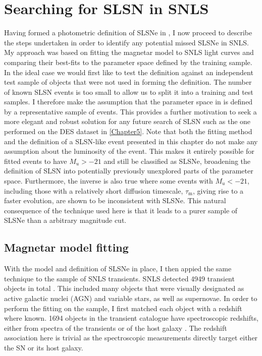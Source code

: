 \section{Searching for SLSN in SNLS}
Having formed a photometric definition of SLSNe in , I now proceed to describe the steps undertaken in order to identify any potential missed SLSNe in SNLS. My approach was based on fitting the magnetar model to SNLS light curves and comparing their best-fits to the parameter space defined by the training sample. In the ideal case we would first like to test the definition against an independent test sample of objects that were not used in forming the definition. The number of known SLSN events is too small to allow us to split it into a training and test samples. I therefore make the assumption that the parameter space in  is defined by a representative sample of events. This provides a further motivation to seek a more elegant and robust solution for any future search of SLSN such as the one performed on the DES dataset in \cref{Chapter5}. Note that both the fitting method and the definition of a SLSN-like event presented in this chapter do not make any assumption about the luminosity of the event. This makes it entirely possible for fitted events to have $M_u>-21$ and still be classified as SLSNe, broadening the definition of SLSN into potentially previously unexplored parts of the parameter space. Furthermore, the inverse is also true where some events with $M_u<-21$, including those with a relatively short diffusion timescale, $\tau_\mathrm{m}$, giving rise to a faster evolution, are shown to be inconsistent with SLSNe. This natural consequence of the technique used here is that it leads to a purer sample of SLSNe than a arbitrary magnitude cut.

\subsection{Magnetar model fitting}
With the model and definition of SLSNe in place, I then appied the same technique to the sample of SNLS transients. SNLS detected 4949 transient objects in total \citep{Perrett2010}. This included many objects that were visually designated as active galactic nuclei (AGN) and variable stars, as well as supernovae. In order to perform the fitting on the sample, I first matched each object with a redshift where known. 1694 objects in the transient catalogue have spectroscopic redshifts, either from spectra of the transients or of the host galaxy \citep{Perrett2012}. The redshift association here is trivial as the spectroscopic measurements directly target either the SN or its host galaxy.

